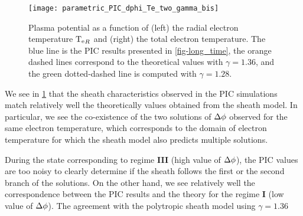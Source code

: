     \begin{figure}[hbt]
      \centering
      \texttt{[image: parametric\_PIC\_dphi\_Te\_two\_gamma\_bis]}
      \caption{Plasma potential as a function of (left) the radial electron temperature $\mathrm{T_e}_R$ and (right) the total electron temperature. The blue line is the \acs{PIC} results presented in \cref{fig-long_time}, the orange dashed lines correspond to the theoretical values with $\gamma=1.36$, and the green dotted-dashed line is computed with $\gamma=1.28$.}
      \label{fig-dphi_te_PIc2}
    \end{figure}
    
    We see in \cref{fig-dphi_te_PIc2} that the sheath characteristics observed in the \ac{PIC}  simulations match relatively well the theoretically values obtained from the sheath model.
    In particular, we see the co-existence of the two solutions of $\Delta \phi$ observed for the same electron temperature, which corresponds to the domain of electron temperature for which the sheath model also predicts multiple solutions.
    
    During the state corresponding to regime {\bf III} (high value of  $\Delta \phi$), the \ac{PIC} values are too noisy to clearly determine if the sheath follows the first or the second branch of the solutions.
    On the other hand, we see relatively well the correspondence between the \ac{PIC} results and the theory for the regime {\bf I} (low value of $\Delta \phi$).
    The agreement with the polytropic sheath model using $\gamma = 1.36$ 
    
    
